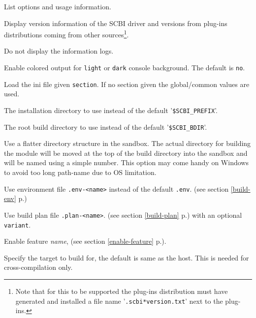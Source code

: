 \documentclass[a4paper,12pt,twoside]{article}
\newcommand{\code}[1]{\texttt{#1}}
\renewcommand{\emph}[1]{\textit{#1}}
\newcommand{\seeref}[1]{see section \ref{#1} p.\pageref{#1}}
\newcommand{\file}[1]{'{\texttt{#1}}'}
\newcommand{\ddash}{-{}-}
\begin{document}
\begin{description}[font=\texttt]
	\item[-h | \ddash{}help] List options and usage information.

	\item[-v | \ddash{}version] Display version information of the SCBI driver and versions from plug-ins distributions coming from other sources\footnote{Note that for this to be supported the plug-ins distribution must have generated and installed a file name \file{.scbi*version.txt} next to the plug-ins.}.

	\item[-q | \ddash{}quiet] Do not display the information logs.

	\item[\ddash{}color:{[}no|light|dark{]}] Enable colored output for \code{light} or \code{dark} console background. The default is \code{no}.

	\item[\ddash{}ini{[}=<section>{]}] Load the ini file given \code{section}. If no section given the global/common values are used.

	\item[\ddash{}prefix=<dir>] The installation directory to use instead of the default \file{\$SCBI\_PREFIX}.

	\item[\ddash{}build-dir=<dir>] The root build directory to use instead of the default \file{\$SCBI\_BDIR}.

	\item[\ddash{}flat] Use a flatter directory structure in the sandbox. The actual directory for building the module will be moved at the top of the build directory into the sandbox and will be named using a simple number. This option may come handy on Windows to avoid too long path-name due to OS limitation.

	\item[-e | \ddash{}env=<name>] Use environment file \code{.env-<name>} instead of the default \code{.env}. (\seeref{build-env})

	\item[\ddash{}plan=<name>{[}/variant{]}] Use build plan file \code{.plan-<name>}. (\seeref{build-plan}) with an optional \code{variant}.

	\item[\ddash{}enable-<name>] Enable feature \emph{name}, (\seeref{enable-feature}).

	\item[-t | \ddash{}target=<name>] Specify the target to build for, the default is same as the host. This is needed for cross-compilation only.


\end{description}
\end{document}
